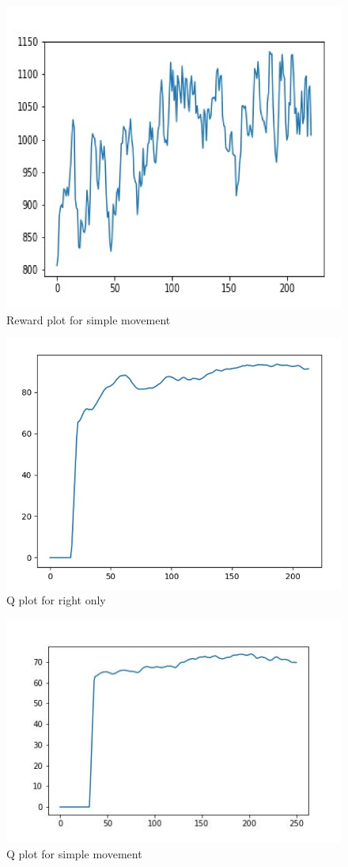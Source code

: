 \documentclass[conference]{IEEEtran}
\theoremstyle{definition}
\begin{document}
\begin{figure}
    \centering
    \includegraphics[width=.90\linewidth] {simple_movement}
    \caption{Reward plot for simple movement}
    \label{fig:}
\end{figure}
\begin{figure}
    \centering
    \includegraphics[width=.90\linewidth] {qplot_right}
    \caption{Q plot for right only}
    \label{fig:my_label}
\end{figure}
\begin{figure}
    \centering
    \includegraphics[width=.90\linewidth] {qplot_simple}
    \caption{Q plot for simple movement}
    \label{fig:my_label}
\end{figure}
\end{document}
